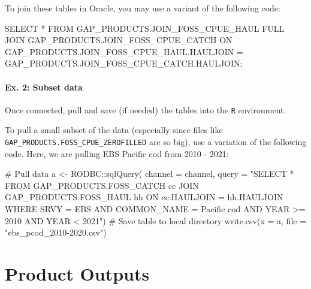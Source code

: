 \documentclass[
  letterpaper,
  oneside,
  open=any]{scrbook}
\newenvironment{Shaded}{\begin{snugshade}}{\end{snugshade}}
\newcommand{\AttributeTok}[1]{\textcolor[rgb]{0.40,0.45,0.13}{#1}}
\newcommand{\CommentTok}[1]{\textcolor[rgb]{0.37,0.37,0.37}{#1}}
\newcommand{\FunctionTok}[1]{\textcolor[rgb]{0.28,0.35,0.67}{#1}}
\newcommand{\KeywordTok}[1]{\textcolor[rgb]{0.00,0.23,0.31}{#1}}
\newcommand{\NormalTok}[1]{\textcolor[rgb]{0.00,0.23,0.31}{#1}}
\newcommand{\OperatorTok}[1]{\textcolor[rgb]{0.37,0.37,0.37}{#1}}
\newcommand{\OtherTok}[1]{\textcolor[rgb]{0.00,0.23,0.31}{#1}}
\newcommand{\SpecialCharTok}[1]{\textcolor[rgb]{0.37,0.37,0.37}{#1}}
\newcommand{\StringTok}[1]{\textcolor[rgb]{0.13,0.47,0.30}{#1}}
\begin{document}
To join these tables in Oracle, you may use a variant of the following
code:

\begin{Shaded}
\begin{Highlighting}[]
\KeywordTok{SELECT} \OperatorTok{*} \KeywordTok{FROM}\NormalTok{ GAP\_PRODUCTS.JOIN\_FOSS\_CPUE\_HAUL}
\KeywordTok{FULL} \KeywordTok{JOIN}\NormalTok{ GAP\_PRODUCTS.JOIN\_FOSS\_CPUE\_CATCH}
\KeywordTok{ON}\NormalTok{ GAP\_PRODUCTS.JOIN\_FOSS\_CPUE\_HAUL.HAULJOIN }\OperatorTok{=}\NormalTok{ GAP\_PRODUCTS.JOIN\_FOSS\_CPUE\_CATCH.HAULJOIN;}
\end{Highlighting}
\end{Shaded}

\hypertarget{ex.-2-subset-data}{%
\subsection{Ex. 2: Subset data}\label{ex.-2-subset-data}}

Once connected, pull and save (if needed) the tables into the \texttt{R}
environment.

To pull a small subset of the data (especially since files like
\texttt{GAP\_PRODUCTS.FOSS\_CPUE\_ZEROFILLED} are so big), use a
variation of the following code. Here, we are pulling EBS Pacific cod
from 2010 - 2021:

\begin{Shaded}
\begin{Highlighting}[]
\CommentTok{\# Pull data}
\NormalTok{a }\OtherTok{\textless{}{-}}\NormalTok{ RODBC}\SpecialCharTok{::}\FunctionTok{sqlQuery}\NormalTok{(}
\AttributeTok{channel =}\NormalTok{ channel, }
\AttributeTok{query =} 
\StringTok{"SELECT * FROM GAP\_PRODUCTS.FOSS\_CATCH cc}
\StringTok{JOIN GAP\_PRODUCTS.FOSS\_HAUL hh}
\StringTok{ON cc.HAULJOIN = hh.HAULJOIN}
\StringTok{WHERE SRVY = \textquotesingle{}EBS\textquotesingle{} }
\StringTok{AND COMMON\_NAME = \textquotesingle{}Pacific cod\textquotesingle{} }
\StringTok{AND YEAR \textgreater{}= 2010 }
\StringTok{AND YEAR \textless{} 2021"}\NormalTok{)}
\CommentTok{\# Save table to local directory}
\FunctionTok{write.csv}\NormalTok{(}\AttributeTok{x =}\NormalTok{ a, }\AttributeTok{file =} \StringTok{"ebs\_pcod\_2010{-}2020.csv"}\NormalTok{)}
\end{Highlighting}
\end{Shaded}

\part{Product Outputs}
\end{document}
